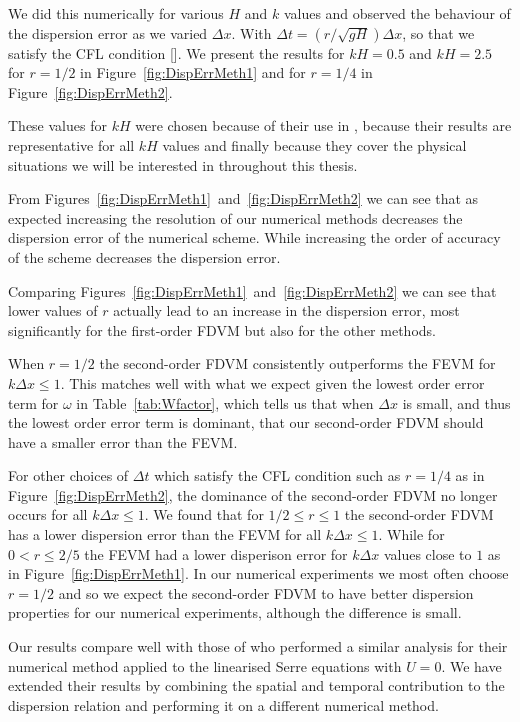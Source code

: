 We did this numerically for various $H$ and $k$ values and observed the behaviour of the dispersion error as we varied $\Delta x$. With $\Delta t =   \left( r / \sqrt{gH} \right) {\Delta x} $, so that we satisfy the CFL condition []. We present the results for $kH = 0.5$ and $kH = 2.5$ for $r=1/2$ in Figure~\ref{fig:DispErrMeth1} and for $r=1/4$ in Figure~\ref{fig:DispErrMeth2}.

These values for $kH$ were chosen because of their use in \cite{Filippini-etal-2016-381}, because their results are representative for all $kH$ values and finally because they cover the physical situations we will be interested in throughout this thesis.


From Figures~\ref{fig:DispErrMeth1}~and~\ref{fig:DispErrMeth2} we can see that as expected increasing the resolution of our numerical methods decreases the dispersion error of the numerical scheme. While increasing the order of accuracy of the scheme decreases the dispersion error. 

Comparing Figures~\ref{fig:DispErrMeth1}~and~\ref{fig:DispErrMeth2} we can see that lower values of $r$ actually lead to an increase in the dispersion error, most significantly for the first-order FDVM but also for the other methods. 

When $r = 1/2 $ the second-order FDVM consistently outperforms the FEVM for $k \Delta x \le 1$. This matches well with what we expect given the lowest order error term for $\omega$ in Table~\ref{tab:Wfactor}, which tells us that when $\Delta x$ is small, and thus the lowest order error term is dominant, that our second-order FDVM should have a smaller error than the FEVM. 

For other choices of $\Delta t$ which satisfy the CFL condition such as $r = 1/4$ as in Figure~\ref{fig:DispErrMeth2}, the dominance of the second-order FDVM no longer occurs for all $k \Delta x \le 1$. We found that for $1/2 \le r \le 1$ the second-order FDVM has a lower dispersion error than the FEVM for all $k \Delta x \le 1$. While for $ 0 < r \le 2/5 $ the FEVM had a lower disperison error for $k \Delta x$ values close to $1$ as in Figure~\ref{fig:DispErrMeth1}. In our numerical experiments we most often choose $r = 1/2$ and so we expect the second-order FDVM to have better dispersion properties for our numerical experiments, although the difference is small. 

Our results compare well with those of \cite{Filippini-etal-2016-381} who performed a similar analysis for their numerical method applied to the linearised Serre equations with $U=0$. We have extended their results by combining the spatial and temporal contribution to the dispersion relation and performing it on a different numerical method.

